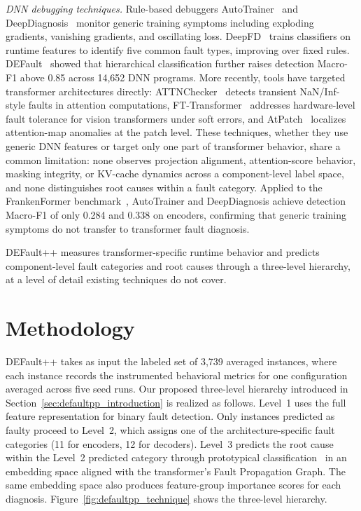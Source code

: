 \textit{DNN debugging techniques.} Rule-based debuggers AutoTrainer~\cite{autotrainer} and DeepDiagnosis~\cite{deepdiagnosis} monitor generic training symptoms including exploding gradients, vanishing gradients, and oscillating loss. DeepFD~\cite{deepfd} trains classifiers on runtime features to identify five common fault types, improving over fixed rules. DEFault~\cite{default} showed that hierarchical classification further raises detection Macro-F1 above 0.85 across 14{,}652 DNN programs. More recently, tools have targeted transformer architectures directly: ATTNChecker~\cite{liang2025attnchecker} detects transient NaN/Inf-style faults in attention computations, FT-Transformer~\cite{fttransformer} addresses hardware-level fault tolerance for vision transformers under soft errors, and AtPatch~\cite{atpatch2026} localizes attention-map anomalies at the patch level. These techniques, whether they use generic DNN features or target only one part of transformer behavior, share a common limitation: none observes projection alignment, attention-score behavior, masking integrity, or KV-cache dynamics across a component-level label space, and none distinguishes root causes within a fault category. Applied to the FrankenFormer benchmark~\cite{frankenformer}, AutoTrainer and DeepDiagnosis achieve detection Macro-F1 of only 0.284 and 0.338 on encoders, confirming that generic training symptoms do not transfer to transformer fault diagnosis.

DEFault++ measures transformer-specific runtime behavior and predicts component-level fault categories and root causes through a three-level hierarchy, at a level of detail existing techniques do not cover.

\section{Methodology}
\label{sec:defaultpp_approach}

DEFault++ takes as input the labeled set of 3{,}739 averaged instances, where each instance records the instrumented behavioral metrics for one configuration averaged across five seed runs. Our proposed three-level hierarchy introduced in Section~\ref{sec:defaultpp_introduction} is realized as follows. Level~1 uses the full feature representation for binary fault detection. Only instances predicted as faulty proceed to Level~2, which assigns one of the architecture-specific fault categories (11 for encoders, 12 for decoders). Level~3 predicts the root cause within the Level~2 predicted category through prototypical classification~\cite{snell2017prototypical} in an embedding space aligned with the transformer's Fault Propagation Graph. The same embedding space also produces feature-group importance scores for each diagnosis. Figure~\ref{fig:defaultpp_technique} shows the three-level hierarchy.


